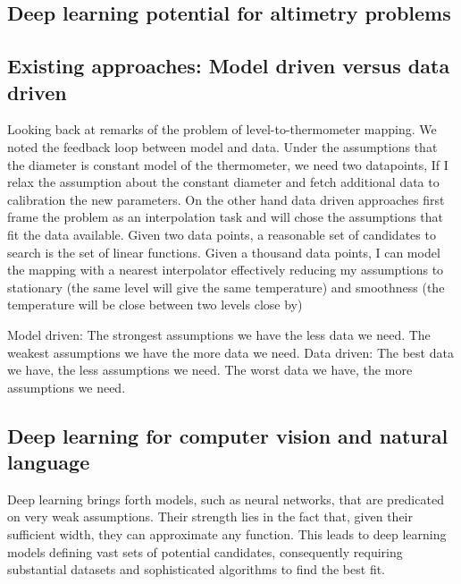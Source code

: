 \begin{bibunit}
\section{Deep learning potential for altimetry problems}
\subsection{Existing approaches: Model driven versus data driven}

Looking back at remarks of the problem of level-to-thermometer mapping. We noted the feedback loop between model and data.
Under the assumptions that the diameter is constant model of the thermometer, we need two datapoints, If I relax the assumption about the constant diameter and fetch additional data to calibration the new parameters.
On the other hand data driven approaches first frame the problem as an interpolation task and will chose the assumptions that fit the data available.
Given two data points, a reasonable set of candidates to search is the set of linear functions. Given a thousand data points, I can model the mapping with a nearest interpolator effectively reducing my assumptions to stationary (the same level will give the same temperature) and smoothness (the temperature will be close between two levels close by)

Model driven: The strongest assumptions we have the less data we need. The weakest assumptions we have the more data we need.
Data driven: The best data we have, the less assumptions we need. The worst data we have, the more assumptions we need.

\subsection{Deep learning for computer vision and natural language}
Deep learning brings forth models, such as neural networks, that are predicated on very weak assumptions. Their strength lies in the fact that, given their sufficient width, they can approximate any function. This leads to deep learning models defining vast sets of potential candidates, consequently requiring substantial datasets and sophisticated algorithms to find the best fit.


\end{bibunit}
